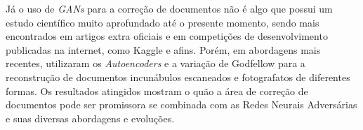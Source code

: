 Já o uso de \textit{GANs} para a correção de documentos não é algo que possui um estudo científico muito aprofundado até o presente momento, sendo mais encontrados em artigos extra oficiais e em competições de desenvolvimento publicadas na internet, como Kaggle e afins. Porém, em abordagens mais recentes,  utilizaram os \textit{Autoencoders} e a variação de Godfellow para a reconstrução de documentos incunábulos escaneados e fotografatos de diferentes formas. Os resultados atingidos mostram o quão a área de correção de documentos pode ser promissora se combinada com as Redes Neurais Adversárias e suas diversas abordagens e evoluções.
